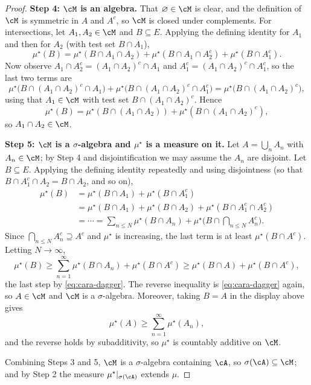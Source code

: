 \begin{proof}
	\textbf{Step 4: $\cM$ is an algebra.} That $\varnothing \in \cM$ is clear, and the definition of $\cM$ is symmetric in $A$ and $A^c$, so $\cM$ is closed under complements. For intersections, let $A_1, A_2 \in \cM$ and $B \subseteq E$. Applying the defining identity for $A_1$ and then for $A_2$ (with test set $B \cap A_1$),
	$$
	\mu^\star(B) = \mu^\star(B \cap A_1 \cap A_2) + \mu^\star(B \cap A_1 \cap A_2^c) + \mu^\star(B\cap A_1^c).
	$$
	Now observe $A_1 \cap A_2^c = (A_1 \cap A_2)^c \cap A_1$ and $A_1^c = (A_1\cap A_2)^c \cap A_1^c$, so the last two terms are
	$$
	\mu^\star\big(B \cap (A_1\cap A_2)^c \cap A_1\big) + \mu^\star\big(B \cap (A_1 \cap A_2)^c \cap A_1^c\big) = \mu^\star\big(B \cap (A_1\cap A_2)^c\big),
	$$
	using that $A_1 \in \cM$ with test set $B \cap (A_1 \cap A_2)^c$. Hence
	$$
	\mu^\star(B) = \mu^\star(B \cap (A_1 \cap A_2)) + \mu^\star(B \cap (A_1\cap A_2)^c),
	$$
	so $A_1 \cap A_2 \in \cM$.

	\textbf{Step 5: $\cM$ is a $\sigma$-algebra and $\mu^\star$ is a measure on it.} Let $A = \bigcup_n A_n$ with $A_n \in \cM$; by Step 4 and disjointification we may assume the $A_n$ are disjoint. Let $B \subseteq E$. Applying the defining identity repeatedly and using disjointness (so that $B \cap A_1^c \cap A_2 = B \cap A_2$, and so on),
	\begin{align*}
		\mu^\star(B) &= \mu^\star(B\cap A_1) + \mu^\star(B \cap A_1^c) \\
		&= \mu^\star(B\cap A_1) + \mu^\star(B\cap A_2) + \mu^\star(B \cap A_1^c \cap A_2^c) \\
		&= \cdots = \sum_{n \leq N} \mu^\star(B \cap A_n) + \mu^\star\Big( B \cap \bigcap_{n \leq N} A_n^c \Big).
	\end{align*}
	Since $\bigcap_{n \leq N} A_n^c \supseteq A^c$ and $\mu^\star$ is increasing, the last term is at least $\mu^\star(B \cap A^c)$. Letting $N \to \infty$,
	$$
	\mu^\star(B) \geq \sum_{n=1}^\infty \mu^\star(B \cap A_n) + \mu^\star(B \cap A^c) \geq \mu^\star(B \cap A) + \mu^\star(B \cap A^c),
	$$
	the last step by \eqref{eq:cara-dagger}. The reverse inequality is \eqref{eq:cara-dagger} again, so $A \in \cM$ and $\cM$ is a $\sigma$-algebra. Moreover, taking $B = A$ in the display above gives
	$$
	\mu^\star(A) \geq \sum_{n=1}^\infty \mu^\star(A_n),
	$$
	and the reverse holds by subadditivity, so $\mu^\star$ is countably additive on $\cM$.

	Combining Steps 3 and 5, $\cM$ is a $\sigma$-algebra containing $\cA$, so $\sigma(\cA) \subseteq \cM$; and by Step 2 the measure $\mu^\star|_{\sigma(\cA)}$ extends $\mu$.
\end{proof}

